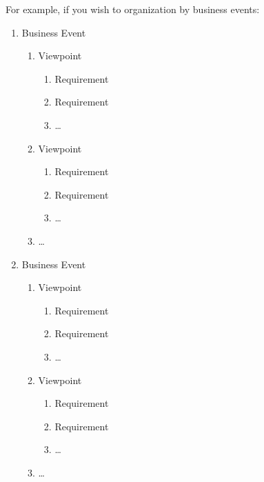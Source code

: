 \documentclass[]{article}
\begin{document}
For example, if you wish to organization by business events:
\begin{enumerate}[{BE}1.]
	\item Business Event
	\begin{enumerate}[{VP1}.1]
		\item Viewpoint
			\begin{enumerate}
				\item Requirement
				\item Requirement
				\item \dots
			\end{enumerate}
		\item Viewpoint
			\begin{enumerate}
				\item Requirement
				\item Requirement
				\item \dots
			\end{enumerate}
		\item \dots
	\end{enumerate}
	\item Business Event
	\begin{enumerate}[{VP2}.1]
		\item Viewpoint
			\begin{enumerate}
				\item Requirement
				\item Requirement
				\item \dots
			\end{enumerate}
		\item Viewpoint
			\begin{enumerate}
				\item Requirement
				\item Requirement
				\item \dots
			\end{enumerate}
		\item \dots
	\end{enumerate}
\end{enumerate}
\end{document}
